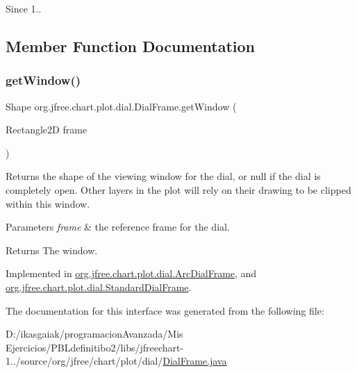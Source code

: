 \begin{DoxySince}{Since}
1.. 
\end{DoxySince}


\subsection{Member Function Documentation}
\mbox{\label{interfaceorg_1_1jfree_1_1chart_1_1plot_1_1dial_1_1_dial_frame_ad7f7696c45b0af4fe283d16a0a630d60}} 
\subsubsection{\texorpdfstring{get\+Window()}{getWindow()}}
{\footnotesize\ttfamily Shape org.\+jfree.\+chart.\+plot.\+dial.\+Dial\+Frame.\+get\+Window (\begin{DoxyParamCaption}\item[{Rectangle2D}]{frame }\end{DoxyParamCaption})}

Returns the shape of the viewing window for the dial, or {\ttfamily null} if the dial is completely open. Other layers in the plot will rely on their drawing to be clipped within this window.


\begin{DoxyParams}{Parameters}
{\em frame} & the reference frame for the dial.\\
\hline
\end{DoxyParams}
\begin{DoxyReturn}{Returns}
The window. 
\end{DoxyReturn}


Implemented in \mbox{\hyperlink{classorg_1_1jfree_1_1chart_1_1plot_1_1dial_1_1_arc_dial_frame_a60aef0f1dc5859e5d1684d8587c3652d}{org.\+jfree.\+chart.\+plot.\+dial.\+Arc\+Dial\+Frame}}, and \mbox{\hyperlink{classorg_1_1jfree_1_1chart_1_1plot_1_1dial_1_1_standard_dial_frame_aa32ae5b534b6461b43ae970382ac18ea}{org.\+jfree.\+chart.\+plot.\+dial.\+Standard\+Dial\+Frame}}.



The documentation for this interface was generated from the following file\+:\begin{DoxyCompactItemize}
\item 
D\+:/ikasgaiak/programacion\+Avanzada/\+Mis Ejercicios/\+P\+B\+Ldefinitibo2/libs/jfreechart-\/1../source/org/jfree/chart/plot/dial/\mbox{\hyperlink{_dial_frame_8java}{Dial\+Frame.\+java}}\end{DoxyCompactItemize}
